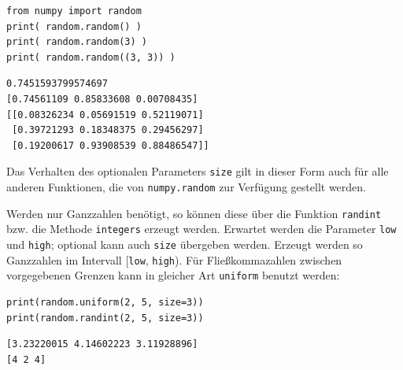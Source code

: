 \begin{tcbraster}[raster columns=2,
                  raster equal height,
                  nobeforeafter,
                  raster column skip=0.5cm]
\begin{codebox}
\begin{verbatim}
from numpy import random
print( random.random() )
print( random.random(3) )
print( random.random((3, 3)) )
\end{verbatim}
\end{codebox}
%
\begin{cmdbox}
\begin{verbatim}
0.7451593799574697
[0.74561109 0.85833608 0.00708435]
[[0.08326234 0.05691519 0.52119071]
 [0.39721293 0.18348375 0.29456297]
 [0.19200617 0.93908539 0.88486547]]
\end{verbatim}
\end{cmdbox}
\end{tcbraster}
Das Verhalten des optionalen Parameters \texttt{size} gilt in dieser Form auch für alle anderen Funktionen, die von \texttt{numpy.random} zur Verfügung gestellt werden.

Werden nur Ganzzahlen benötigt, so können diese über die Funktion \texttt{randint} bzw. die Methode \texttt{integers} erzeugt werden. Erwartet werden die Parameter \texttt{low} und \texttt{high}; optional kann auch \texttt{size} übergeben werden. Erzeugt werden so Ganzzahlen im Intervall [\texttt{low}, \texttt{high}). Für Fließkommazahlen zwischen vorgegebenen Grenzen kann in gleicher Art \texttt{uniform} benutzt werden: 

\begin{tcbraster}[raster columns=2,
                  raster equal height,
                  nobeforeafter,
                  raster column skip=0.5cm]
\begin{codebox}
\begin{verbatim}
print(random.uniform(2, 5, size=3))
print(random.randint(2, 5, size=3))
\end{verbatim}
\end{codebox}
%
\begin{cmdbox}
\begin{verbatim}
[3.23220015 4.14602223 3.11928896]
[4 2 4]
\end{verbatim}
\end{cmdbox}
\end{tcbraster}

